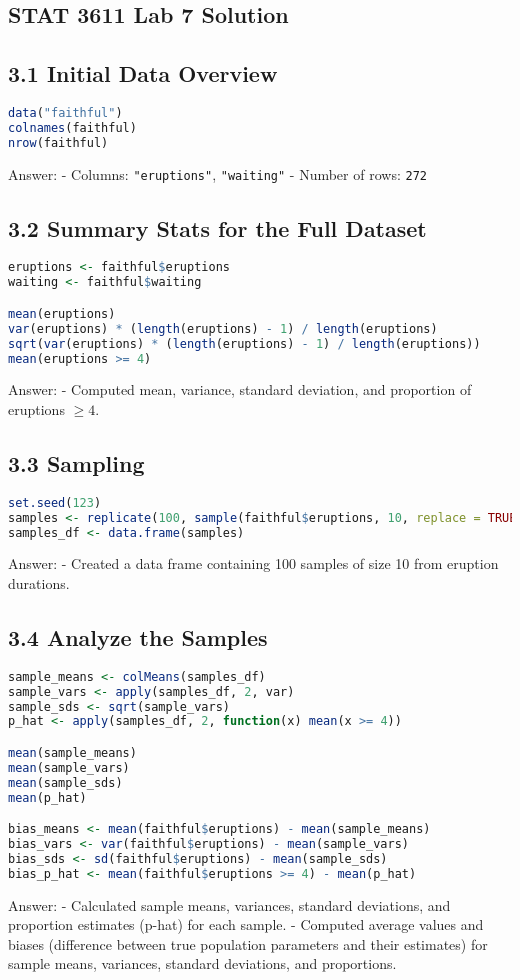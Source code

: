 \documentclass{article}
\begin{document}
\subsection*{STAT 3611 Lab 7 Solution}

\subsection*{3.1 Initial Data Overview}
\begin{lstlisting}[language=R]
data("faithful")
colnames(faithful)
nrow(faithful)
\end{lstlisting}
Answer:
- Columns: \texttt{"eruptions"}, \texttt{"waiting"}
- Number of rows: \texttt{272}

\subsection*{3.2 Summary Stats for the Full Dataset}
\begin{lstlisting}[language=R]
eruptions <- faithful$eruptions
waiting <- faithful$waiting

mean(eruptions)
var(eruptions) * (length(eruptions) - 1) / length(eruptions)
sqrt(var(eruptions) * (length(eruptions) - 1) / length(eruptions))
mean(eruptions >= 4)
\end{lstlisting}
Answer:
- Computed mean, variance, standard deviation, and proportion of eruptions $\geq 4$.

\subsection*{3.3 Sampling}
\begin{lstlisting}[language=R]
set.seed(123)
samples <- replicate(100, sample(faithful$eruptions, 10, replace = TRUE))
samples_df <- data.frame(samples)
\end{lstlisting}
Answer:
- Created a data frame containing 100 samples of size 10 from eruption durations.

\subsection*{3.4 Analyze the Samples}
\begin{lstlisting}[language=R]
sample_means <- colMeans(samples_df)
sample_vars <- apply(samples_df, 2, var)
sample_sds <- sqrt(sample_vars)
p_hat <- apply(samples_df, 2, function(x) mean(x >= 4))

mean(sample_means)
mean(sample_vars)
mean(sample_sds)
mean(p_hat)

bias_means <- mean(faithful$eruptions) - mean(sample_means)
bias_vars <- var(faithful$eruptions) - mean(sample_vars)
bias_sds <- sd(faithful$eruptions) - mean(sample_sds)
bias_p_hat <- mean(faithful$eruptions >= 4) - mean(p_hat)
\end{lstlisting}
Answer:
- Calculated sample means, variances, standard deviations, and proportion estimates (p-hat) for each sample.
- Computed average values and biases (difference between true population parameters and their estimates) for sample means, variances, standard deviations, and proportions.
\end{document}

